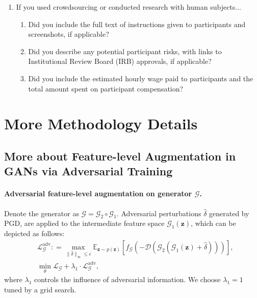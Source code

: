\documentclass{article}
\newcommand{\Def}[0]{\mathrel{\mathop:}=}
\begin{document}
\begin{enumerate}
\item If you used crowdsourcing or conducted research with human subjects...
\begin{enumerate}
  \item Did you include the full text of instructions given to participants and screenshots, if applicable?
    \answerNA{}
  \item Did you describe any potential participant risks, with links to Institutional Review Board (IRB) approvals, if applicable?
    \answerNA{}
  \item Did you include the estimated hourly wage paid to participants and the total amount spent on participant compensation?
    \answerNA{}
\end{enumerate}

\end{enumerate}


\section{More Methodology Details}\label{sec:more_methods}

\subsection{More about Feature-level Augmentation in GANs via Adversarial Training}

\paragraph{Adversarial feature-level augmentation on generator $\mathcal{G}$.} Denote the generator as $\mathcal{G}=\mathcal{G}_2\circ\mathcal{G}_1$. Adversarial perturbations $\hat\delta$ generated by PGD, are applied to the intermediate feature space $\mathcal{G}_1(\boldsymbol{z})$, which can be depicted as follows:  
\begin{align}
&\mathcal{L}^{\mathrm{adv}}_{\mathcal{G}}\Def\max_{\|\hat\delta\|_{\infty}\le\epsilon}\mathbb{E}_{\boldsymbol{z}\sim p(\boldsymbol{z})}[f_{\mathcal{G}}(-\mathcal{D}(\mathcal{G}_2(\mathcal{G}_1(\boldsymbol{z})+\hat\delta)))], \label{eq:adv_g} \\ 
&\min_{\theta}\mathcal{L}_\mathcal{G}+\lambda_1\cdot\mathcal{L}^{\mathrm{adv}}_{\mathcal{G}}, \label{eq:min_adv_g}
\end{align}
where $\lambda_1$ controls the influence of adversarial information. We choose $\lambda_1=1$ tuned by a grid search.
\end{document}
